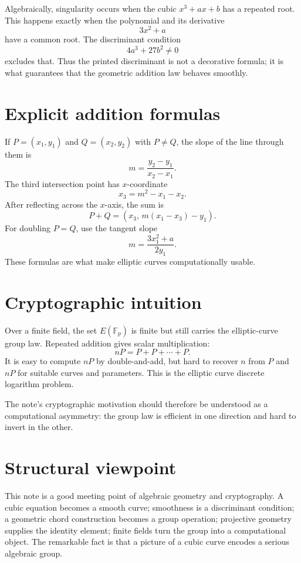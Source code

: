 Algebraically, singularity occurs when the cubic \(x^3+ax+b\) has a repeated root.  This happens exactly when the polynomial and its derivative
\[
  3x^2+a
\]
have a common root.  The discriminant condition
\[
  4a^3+27b^2\ne0
\]
excludes that.  Thus the printed discriminant is not a decorative formula; it is what guarantees that the geometric addition law behaves smoothly.

\section{Explicit addition formulas}

If \(P=(x_1,y_1)\) and \(Q=(x_2,y_2)\) with \(P\ne Q\), the slope of the line through them is
\[
  m=\frac{y_2-y_1}{x_2-x_1}.
\]
The third intersection point has \(x\)-coordinate
\[
  x_3=m^2-x_1-x_2.
\]
After reflecting across the \(x\)-axis, the sum is
\[
  P+Q=(x_3,\,m(x_1-x_3)-y_1).
\]
For doubling \(P=Q\), use the tangent slope
\[
  m=\frac{3x_1^2+a}{2y_1}.
\]
These formulas are what make elliptic curves computationally usable.

\section{Cryptographic intuition}

Over a finite field, the set \(E(\mathbb F_p)\) is finite but still carries the elliptic-curve group law.  Repeated addition gives scalar multiplication:
\[
  nP=P+P+\cdots+P.
\]
It is easy to compute \(nP\) by double-and-add, but hard to recover \(n\) from \(P\) and \(nP\) for suitable curves and parameters.  This is the elliptic curve discrete logarithm problem.

The note's cryptographic motivation should therefore be understood as a computational asymmetry: the group law is efficient in one direction and hard to invert in the other.

\section{Structural viewpoint}

This note is a good meeting point of algebraic geometry and cryptography.  A cubic equation becomes a smooth curve; smoothness is a discriminant condition; a geometric chord construction becomes a group operation; projective geometry supplies the identity element; finite fields turn the group into a computational object.  The remarkable fact is that a picture of a cubic curve encodes a serious algebraic group.

